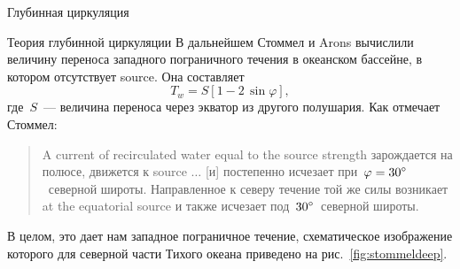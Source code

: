 \begin{chapter}{Глубинная циркуляция}
\begin{section}{Теория глубинной циркуляции}
В дальнейшем Стоммел и Arons вычислили величину 
переноса западного пограничного
течения в океанском бассейне, в котором отсутствует source. 
Она составляет
\begin{equation}
 T_w = S \left[ 1 - 2 \, \sin \varphi \right],
\end{equation}
где~$S$~--- величина переноса через экватор
из другого полушария. Как отмечает Стоммел:
\begin{quote}
A current of recirculated water equal to the source strength зарождается 
на полюсе, движется к source $\ldots$ [и] постепенно исчезает 
при~$\varphi = {30}^\circ$~северной широты. 
Направленное к северу течение той же силы возникает 
 at the equatorial source
и также исчезает под~${30}^\circ$~северной широты.
\end{quote}
В целом, это дает нам западное пограничное течение, схематическое изображение
которого для северной части Тихого океана приведено 
на рис.~\ref{fig:stommeldeep}.
%


\end{section}
\end{chapter}

